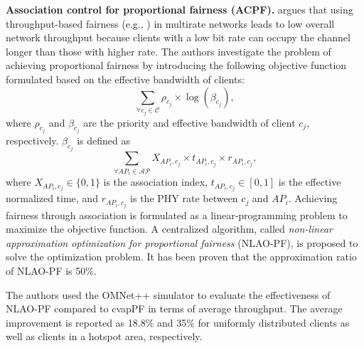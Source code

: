 







\textbf{Association control for proportional fairness (ACPF).}
\cite{Proportional-Fairness-AP-2014} argues that using throughput-based fairness (e.g., \cite{Time-based-basic-1, Time-based-basic-2}) in multirate networks leads to low overall network throughput because clients with a low bit rate can occupy the channel longer than those with higher rate. 
The authors investigate the problem of achieving proportional fairness by introducing the following objective function formulated based on the effective bandwidth of clients:
\begin{equation}
\sum_{\forall c_{j}\in \mathcal{C}} \rho_{c_{j}} \times  \log (\beta_{c_{j}}),
\end{equation}
where $\rho_{c_{j}}$ and $\beta_{c_{j}}$ are the priority and effective bandwidth of client $c_{j}$, respectively. 
$\beta_{c_{j}}$ is defined as 
\begin{equation}
\sum_{\forall AP_{i}\in \mathcal{AP}}X_{AP_{i},c_{j}}\times t_{AP_{i},c_{j}}\times r_{AP_{i},c_{j}}, 
\end{equation}
where $X_{AP_{i},c_{j}}\in\{0,1\}$ is the association index, $t_{AP_{i},c_{j}}\in[0,1]$ is the effective normalized time, and $r_{AP_{i},c_{j}}$ is the PHY rate between $c_{j}$ and $AP_{i}$. 
Achieving fairness through association is formulated as a linear-programming problem to maximize the objective function.
A centralized algorithm, called \textit{non-linear approximation optimization for proportional fairness} (NLAO-PF), is proposed to solve the optimization problem.
It has been proven that the approximation ratio of NLAO-PF is 50\%.

The authors used the OMNet++ \cite{OMNET} simulator to evaluate the effectiveness of NLAO-PF compared to cvapPF \cite{cvapPF} in terms of average throughput. 
The average improvement is reported as 18.8$\%$ and 35$\%$ for uniformly distributed clients as well as clients in a hotspot area, respectively.



